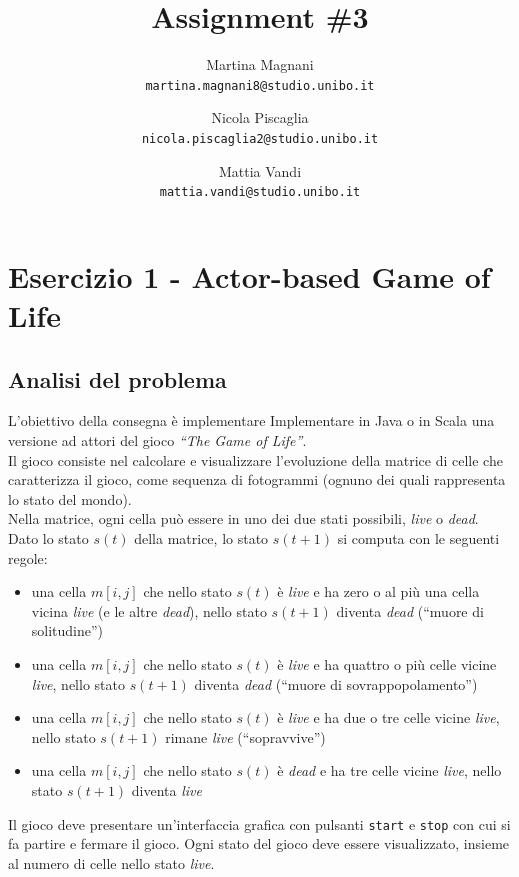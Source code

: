 \documentclass[a4paper]{report}
\title{\Huge \bf
Assignment \#3
}
\author{
    Martina Magnani\\
    \texttt{martina.magnani8@studio.unibo.it}
    \and
    Nicola Piscaglia\\
    \texttt{nicola.piscaglia2@studio.unibo.it}
    \and
    Mattia Vandi\\
    \texttt{mattia.vandi@studio.unibo.it}
}
\date{}
\begin{document}
\maketitle

\tableofcontents

\chapter{Esercizio 1 - Actor-based Game of Life}
\section{Analisi del problema}\label{analisi-del-problema-1}

L'obiettivo della consegna è implementare Implementare in Java o in Scala una versione ad attori del gioco \textit{``The Game of Life''}.\\
Il gioco consiste nel calcolare e visualizzare l'evoluzione della matrice di celle che caratterizza il gioco, come sequenza di fotogrammi (ognuno dei quali rappresenta lo stato del mondo).\\
Nella matrice, ogni cella può essere in uno dei due stati possibili, \textit{live} o \textit{dead}.\\
Dato lo stato $s\left(t\right)$ della matrice, lo stato $s\left(t + 1\right)$ si computa con le seguenti regole:

\begin{itemize}
\item
  una cella $m\left[i,j\right]$ che nello stato $s\left(t\right)$ è \textit{live} e ha zero o al più una cella vicina \textit{live} (e le altre \textit{dead}), nello stato $s\left(t + 1\right)$ diventa \textit{dead} (``muore di solitudine'')
\item
  una cella $m\left[i,j\right]$ che nello stato $s\left(t\right)$ è \textit{live} e ha quattro o più celle vicine \textit{live}, nello stato $s\left(t + 1\right)$ diventa \textit{dead} (``muore di sovrappopolamento'')
\item
  una cella $m\left[i,j\right]$ che nello stato $s\left(t\right)$ è \textit{live} e ha due o tre celle vicine \textit{live}, nello stato $s\left(t + 1\right)$ rimane \textit{live} (``sopravvive'')
\item
  una cella $m\left[i,j\right]$ che nello stato $s\left(t\right)$ è \textit{dead} e ha tre celle vicine \textit{live}, nello stato $s\left(t + 1\right)$ diventa \textit{live}
\end{itemize}
Il gioco deve presentare un'interfaccia grafica con pulsanti \texttt{start} e \texttt{stop} con cui si fa partire e fermare il gioco.
Ogni stato del gioco deve essere visualizzato, insieme al numero di celle nello stato \textit{live}.
\end{document}
